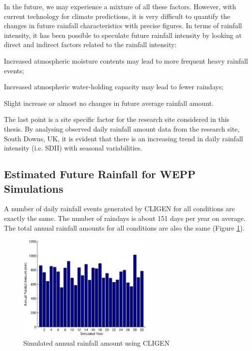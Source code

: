 In the future, we may experience a mixture of all these factors. However, with
current technology for climate predictions, it is very difficult to quantify the
changes in future rainfall characteristics with precise figures. In terms of
rainfall intensity, it has been possible to speculate future rainfall intensity
by looking at direct and indirect factors related to the rainfall intensity:
\begin{itemize*}
  \item Increased atmospheric moisture contents may lead to more frequent
heavy rainfall events;
  \item Increased atmospheric water-holding capacity may lead to fewer
raindays;
  \item Slight increase or almost no changes in future average rainfall
amount.
\end{itemize*}
The last point is a site specific factor for the research site considered in
this thesis. By analysing observed daily rainfall amount data from the research
site, South Downs, UK, it is evident that there is an increasing trend in daily
rainfall intensity (i.e. SDII) with seasonal variabilities.

\subsection{Estimated Future Rainfall for WEPP Simulations}
\label{sec:stimatedFutureRainfall}

A number of daily rainfall events generated by CLIGEN for all conditions are
exactly the same. The number of raindays is about 151 days per year on average.
The total annual rainfall amounts for all conditions are also the same (Figure
\ref{fig:annual_future_rainfall}).

\begin{figure}[htbp]
  \centering
    \includegraphics[width=0.60\textwidth]
{./img/annual_future_rainfall}
  \caption{Simulated annual rainfall amount using CLIGEN}
  \label{fig:annual_future_rainfall}
\end{figure}

